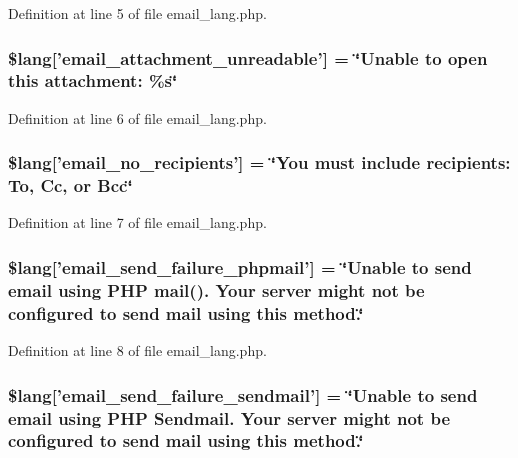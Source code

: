 Definition at line 5 of file email\-\_\-lang.\-php.

\hypertarget{email__lang_8php_acae2e9f7ade1ac9c6b67db0ff752414e}{
\subsubsection[{\$lang}]{\setlength{\rightskip}{0pt plus 5cm}\$lang\mbox{[}'email\-\_\-attachment\-\_\-unreadable'\mbox{]} = \char`\"{}Unable {\bf to} open this attachment\-: \%s\char`\"{}}}\label{email__lang_8php_acae2e9f7ade1ac9c6b67db0ff752414e}


Definition at line 6 of file email\-\_\-lang.\-php.

\hypertarget{email__lang_8php_a8f9d5a049f4dd899d4e61f6d56be5071}{
\subsubsection[{\$lang}]{\setlength{\rightskip}{0pt plus 5cm}\$lang\mbox{[}'email\-\_\-no\-\_\-recipients'\mbox{]} = \char`\"{}You must include recipients\-: To, Cc, {\bf or} Bcc\char`\"{}}}\label{email__lang_8php_a8f9d5a049f4dd899d4e61f6d56be5071}


Definition at line 7 of file email\-\_\-lang.\-php.

\hypertarget{email__lang_8php_a99a2ce89426340b4c96a245b7874a99d}{
\subsubsection[{\$lang}]{\setlength{\rightskip}{0pt plus 5cm}\$lang\mbox{[}'email\-\_\-send\-\_\-failure\-\_\-phpmail'\mbox{]} = \char`\"{}Unable {\bf to} send email using P\-H\-P mail(). Your server might {\bf not} be configured {\bf to} send mail using this method.\char`\"{}}}\label{email__lang_8php_a99a2ce89426340b4c96a245b7874a99d}


Definition at line 8 of file email\-\_\-lang.\-php.

\hypertarget{email__lang_8php_a0cfda188d86472ad2f3b96a67de75b4d}{
\subsubsection[{\$lang}]{\setlength{\rightskip}{0pt plus 5cm}\$lang\mbox{[}'email\-\_\-send\-\_\-failure\-\_\-sendmail'\mbox{]} = \char`\"{}Unable {\bf to} send email using P\-H\-P Sendmail. Your server might {\bf not} be configured {\bf to} send mail using this method.\char`\"{}}}\label{email__lang_8php_a0cfda188d86472ad2f3b96a67de75b4d}


